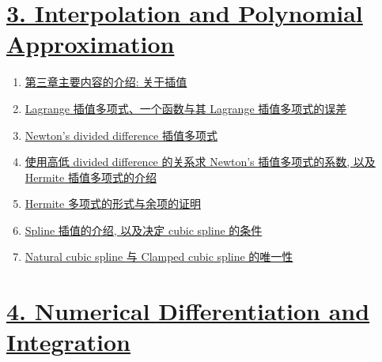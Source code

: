 \documentclass[11pt]{article}
\begin{document}
\vspace{-1cm}

\section*{\href{https://www.youtube.com/playlist?list=PLGwoNNTgFGejoumJVBpp-V046IPxJqWUu}{3. Interpolation and Polynomial Approximation}} %

\vspace{-0.5cm}

\begin{enumerate}
	\item \href{https://mp.weixin.qq.com/s/PLQKX2qhPnwlk1HUNizH5A}{第三章主要内容的介绍: 关于插值} %
	\item \href{https://mp.weixin.qq.com/s/wu2pRrydW-SUvpQY8-x5wg}{Lagrange 插值多项式、一个函数与其 Lagrange 插值多项式的误差} %
	\item \href{https://mp.weixin.qq.com/s/iMYF5UcoD65mAuAc3gUPSg}{Newton's divided difference 插值多项式} %
	\item \href{https://mp.weixin.qq.com/s/kGiKqbzl1A8fTdq-HDnsZQ}{使用高低 divided difference 的关系求 Newton's 插值多项式的系数, 以及 Hermite 插值多项式的介绍} %
	\item \href{https://mp.weixin.qq.com/s/P64oecp7mFGH7QsRlzX6_A}{Hermite 多项式的形式与余项的证明} %
	\item \href{https://mp.weixin.qq.com/s/jMgpFqg1XSVp2-eTpZb7Vw}{Spline 插值的介绍, 以及决定 cubic spline 的条件} %
	\item \href{https://mp.weixin.qq.com/s/bWMkLmoaJ-QsIaklfTtS-A}{Natural cubic spline 与 Clamped cubic spline 的唯一性} %
\end{enumerate}

\vspace{-1cm}

\section*{\href{https://www.youtube.com/playlist?list=PLGwoNNTgFGehTrxUCQ47fvWbH5YqPViUB}{4. Numerical Differentiation and Integration}} %

\vspace{-0.5cm}
\end{document}
